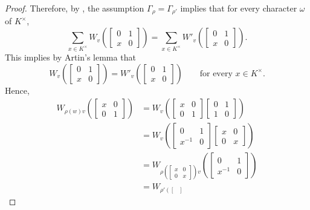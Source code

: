 \documentclass[../main.tex]{subfiles}
\begin{document}
\begin{proof}
	Therefore, by , the assumption $\Gamma_{\rho}=\Gamma_{\rho'}$ implies that for every character $\omega$ of $K^\times$,
	\[\sum_{x\in K^\times}W_v\left(\begin{bmatrix}
		0 & 1 \\
		x & 0
	\end{bmatrix}\right)=\sum_{x\in K^\times}W'_v\left(\begin{bmatrix}
		0 & 1 \\
		x & 0
	\end{bmatrix}\right).\]
	This implies by Artin's lemma that
	\[W_v\left(\begin{bmatrix}
		0 & 1 \\
		x & 0
	\end{bmatrix}\right)=W'_v\left(\begin{bmatrix}
		0 & 1 \\
		x & 0
	\end{bmatrix}\right)\qquad\text{for every }x\in K^\times.\]
	Hence,
	\begin{align*}
		W_{\rho(w)v}\left(\begin{bmatrix}
			x & 0 \\
			0 & 1
		\end{bmatrix}\right) &= W_v\left(\begin{bmatrix}
			x & 0 \\
			0 & 1
		\end{bmatrix}\begin{bmatrix}
			0 & 1 \\
			1 & 0
		\end{bmatrix}\right) \\
		&= W_v\left(\begin{bmatrix}
			0 & 1 \\
			x^{-1} & 0
		\end{bmatrix}\begin{bmatrix}
			x & 0 \\
			0 & x
		\end{bmatrix}\right) \\
		&= W_{\rho\left(\begin{bmatrix}
			x & 0 \\
			0 & x
		\end{bmatrix}\right)v}\left(\begin{bmatrix}
			0 & 1 \\
			x^{-1} & 0
		\end{bmatrix}\right) \\
		&= W_{\rho'\left(\begin{bmatrix}

\end{bmatrix}}
\end{align*}
\end{proof}
\end{document}
